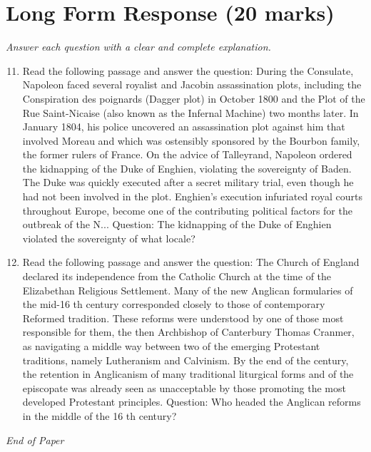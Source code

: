 \documentclass[12pt]{article}
\begin{document}
\section*{Long Form Response (20 marks)}
\textit{Answer each question with a clear and complete explanation.}
\begin{enumerate}[label=\arabic*.]
\setcounter{enumi}{10}
\item Read the following passage and answer the question: During the Consulate, Napoleon faced several royalist and Jacobin assassination plots, including the Conspiration des poignards (Dagger plot) in October 1800 and the Plot of the Rue Saint-Nicaise (also known as the Infernal Machine) two months later. In January 1804, his police uncovered an assassination plot against him that involved Moreau and which was ostensibly sponsored by the Bourbon family, the former rulers of France. On the advice of Talleyrand, Napoleon ordered the kidnapping of the Duke of Enghien, violating the sovereignty of Baden. The Duke was quickly executed after a secret military trial, even though he had not been involved in the plot. Enghien's execution infuriated royal courts throughout Europe, become one of the contributing political factors for the outbreak of the N... Question: The kidnapping of the Duke of Enghien violated the sovereignty of what locale?
\item Read the following passage and answer the question: The Church of England declared its independence from the Catholic Church at the time of the Elizabethan Religious Settlement. Many of the new Anglican formularies of the mid-16 th century corresponded closely to those of contemporary Reformed tradition. These reforms were understood by one of those most responsible for them, the then Archbishop of Canterbury Thomas Cranmer, as navigating a middle way between two of the emerging Protestant traditions, namely Lutheranism and Calvinism. By the end of the century, the retention in Anglicanism of many traditional liturgical forms and of the episcopate was already seen as unacceptable by those promoting the most developed Protestant principles. Question: Who headed the Anglican reforms in the middle of the 16 th century?
\end{enumerate}

\vfill
\noindent\textit{End of Paper}
\end{document}
